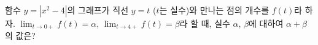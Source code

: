 함수 $y=|x^2-4|$의 그래프가 직선 $y=t$ ($t$는 실수)와 만나는 점의 개수를 $f(t)$라 하자. $\displaystyle\lim_{t\to 0+} f(t)=\alpha$, $\displaystyle\lim_{t\to 4+} f(t)=\beta$라 할 때, 실수 $\alpha$, $\beta$에 대하여 $\alpha+\beta$의 값은?
